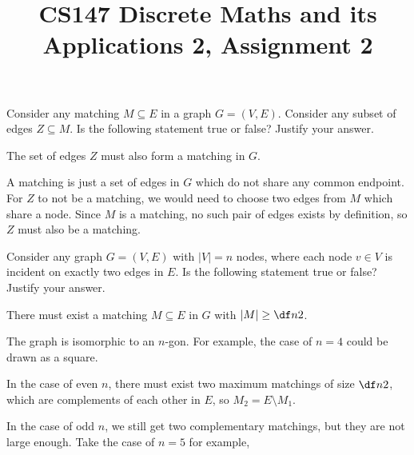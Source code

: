 \documentclass[a4paper]{article}
\title{CS147 Discrete Maths and its Applications 2, Assignment 2}
\begin{document}
\maketitle

\setlength{\parindent}{0em}
\setlength{\parskip}{1em}


\begin{questionbody}
Consider any matching $M \subseteq E$ in a graph $G = (V, E)$. Consider any subset of edges $Z \subseteq M$. Is the following statement true or false? Justify your answer.

The set of edges $Z$ must also form a matching in $G$.
\end{questionbody}

A matching is just a set of edges in $G$ which do not share any common endpoint. For $Z$ to not be a matching, we would need to choose two edges from $M$ which share a node. Since $M$ is a matching, no such pair of edges exists by definition, so $Z$ must also be a matching.



\begin{questionbody}
Consider any graph $G = (V, E)$ with $|V| = n$ nodes, where each node $v \in V$ is incident on exactly two edges in $E$. Is the following statement true or false? Justify your answer.

There must exist a matching $M \subseteq E$ in $G$ with $|M| \ge \df n2$.
\end{questionbody}

The graph is isomorphic to an $n$-gon. For example, the case of $n=4$ could be drawn as a square.

In the case of even $n$, there must exist two maximum matchings of size $\df n2$, which are complements of each other in $E$, so $M_2 = E \setminus M_1$.

In the case of odd $n$, we still get two complementary matchings, but they are not large enough. Take the case of $n=5$ for example,

\begin{center}
\end{center}
\end{document}
